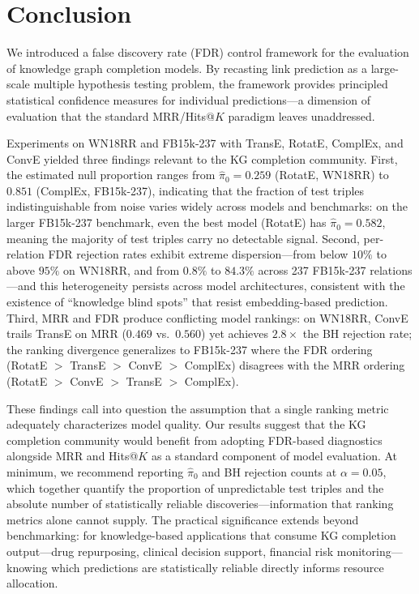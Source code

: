 \section{Conclusion}
\label{sec:conclusion}

We introduced a false discovery rate (FDR) control framework for the evaluation of knowledge graph completion models.
By recasting link prediction as a large-scale multiple hypothesis testing problem, the framework provides principled statistical confidence measures for individual predictions---a dimension of evaluation that the standard MRR/Hits@$K$ paradigm leaves unaddressed.

Experiments on WN18RR and FB15k-237 with TransE, RotatE, ComplEx, and ConvE yielded three findings relevant to the KG completion community.
First, the estimated null proportion ranges from $\hat{\pi}_0 = 0.259$ (RotatE, WN18RR) to $0.851$ (ComplEx, FB15k-237), indicating that the fraction of test triples indistinguishable from noise varies widely across models and benchmarks: on the larger FB15k-237 benchmark, even the best model (RotatE) has $\hat{\pi}_0 = 0.582$, meaning the majority of test triples carry no detectable signal.
Second, per-relation FDR rejection rates exhibit extreme dispersion---from below $10\%$ to above $95\%$ on WN18RR, and from $0.8\%$ to $84.3\%$ across 237 FB15k-237 relations---and this heterogeneity persists across model architectures, consistent with the existence of ``knowledge blind spots'' that resist embedding-based prediction.
Third, MRR and FDR produce conflicting model rankings: on WN18RR, ConvE trails TransE on MRR ($0.469$ vs.\ $0.560$) yet achieves $2.8\times$ the BH rejection rate; the ranking divergence generalizes to FB15k-237 where the FDR ordering (RotatE $>$ TransE $>$ ConvE $>$ ComplEx) disagrees with the MRR ordering (RotatE $>$ ConvE $>$ TransE $>$ ComplEx).

These findings call into question the assumption that a single ranking metric adequately characterizes model quality.
Our results suggest that the KG completion community would benefit from adopting FDR-based diagnostics alongside MRR and Hits@$K$ as a standard component of model evaluation.
At minimum, we recommend reporting $\hat{\pi}_0$ and BH rejection counts at $\alpha = 0.05$, which together quantify the proportion of unpredictable test triples and the absolute number of statistically reliable discoveries---information that ranking metrics alone cannot supply.
The practical significance extends beyond benchmarking: for knowledge-based applications that consume KG completion output---drug repurposing, clinical decision support, financial risk monitoring---knowing which predictions are statistically reliable directly informs resource allocation.

